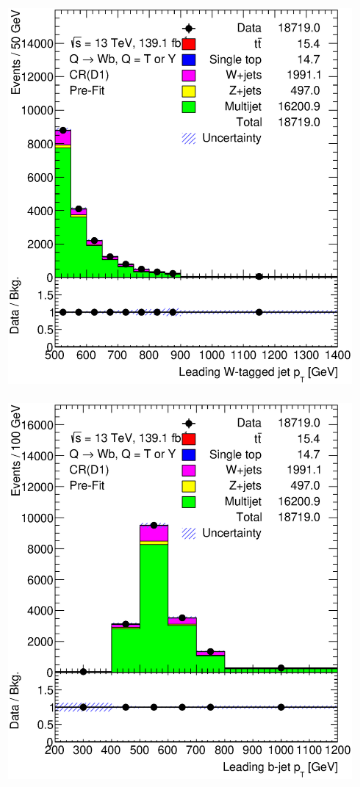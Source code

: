 \begin{figure}[hbt!]
	\centering
	\graphicspath{{figs/appendix/CRD1/}}
	\begin{subfigure}{.35\textwidth}
		\centering
		\includegraphics[width=\linewidth,height=\textheight,keepaspectratio]{CR_D1_ljet_pt.eps}
		\caption{}
		\label{fig:app:cr_d1:ljet_pt}
	\end{subfigure}\hspace{0.6cm}
	\begin{subfigure}{.35\textwidth}
		\centering
		\includegraphics[width=\linewidth,height=\textheight,keepaspectratio]{CR_D1_jet_pt.eps}

\end{subfigure}
\end{figure}
